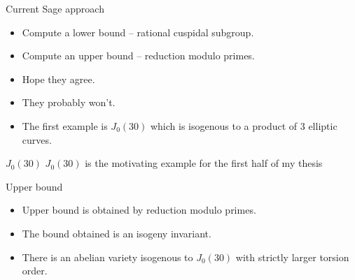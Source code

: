 \documentclass{beamer}
\newcommand{\QQ}{\mathbf{Q}}
\newcommand{\FF}{\mathbf{F}}
\newcommand{\tor}{\mathrm{tor}}
\newcommand{\Frob}{\mathrm{Frob}}
\newcommand{\p}{\mathfrak{p}}
\begin{document}
\begin{frame}{Current Sage approach}
    \begin{itemize}
        \item
            Compute a lower bound -- rational cuspidal subgroup.
        \item
            Compute an upper bound -- reduction modulo primes.
        \item
            Hope they agree.
        \item
            They probably won't.
        \item
            The first example is $J_0(30)$ which is
            isogenous to a product of 3 elliptic curves.
    \end{itemize}
\end{frame}

\begin{frame}{$J_0(30)$}
    \Large{$J_0(30)$ is the motivating example for the first half of my thesis}
\end{frame}

\begin{frame}{Upper bound}
    \begin{itemize}
        \item
            Upper bound is obtained by reduction modulo primes.
        \item
            The bound obtained is an isogeny invariant.
        \item
            There is an abelian variety isogenous to $J_0(30)$ with strictly
            larger torsion order.
    \end{itemize}
\end{frame}

\end{document}
